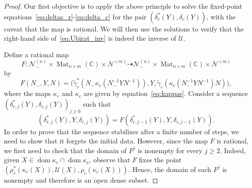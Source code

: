 \documentclass[11pt]{article}
\DeclareMathOperator{\Mat}{Mat}
\DeclareMathOperator{\dom}{dom}
\theoremstyle{definition}\newtheorem{definition}[theorem]{Definition}
\theoremstyle{definition}\newtheorem{remark}[theorem]{Remark}
\theoremstyle{remark}
\numberwithin{equation}{section}
\begin{document}
\begin{proof}
    Our first objective is to apply the above principle to solve the fixed-point equations~\eqref{eq:deltas_r}-\eqref{eq:delta_c} for the pair $(\delta_r^*(Y),\delta_c(Y))$, with the caveat that the map is rational. We will then use the solutions to verify that the right-hand side of~\eqref{eq:Ubirat_inv} is indeed the inverse of $\mathcal{U}$.
    
    Define a rational map 
    \begin{equation*}
        F : \mathcal{N}_-^{(n)}\times \Mat_{n\times m}(\mathbb{C})\times  \mathcal{N}^{(m)} \dashrightarrow \mathcal{N}_-^{(n)}\times  \Mat_{n\times m}(\mathbb{C}) \times \mathcal{N}^{(m)} 
    \end{equation*}
    by
       \begin{equation*}
        F(N_-,Y,N) = \big(\tilde{\gamma}_r^*(N_-\kappa_r(N_-^{-1}YN^{-1})), Y,\tilde{\gamma}_c(\kappa_c(N_-^{-1}YN^{-1})N) \big),
    \end{equation*}
    where the maps $\kappa_r$ and $\kappa_c$ are given by equation~\eqref{eq:kappas}. Consider a sequence $(\delta_{r,j}^*(Y),\delta_{c,j}(Y))_{j \geq 0}$
    such that
    \begin{equation}\label{eq:delta_dynamics}
        (\delta_{r,j}^*(Y),Y,\delta_{c,j}(Y)) = F(\delta_{r,j-1}^*(Y),Y,\delta_{c,j-1}(Y)).
    \end{equation}
    In order to prove that the sequence stabilizes after a finite number of steps, we need to show that it forgets the initial data. However, since the map $F$ is rational, we first need to check that the domain of $F^j$ is nonempty for every $j \geq 2$. Indeed, given $X \in \dom \kappa_r \cap \dom \kappa_c$, observe that $F$ fixes the point $(\rho_r^*(\kappa_r(X)),\mathcal{U}(X),\rho_c(\kappa_c(X)))$. Hence, the domain of each $F^j$ is nonempty and therefore is an open dense subset. 
    

\end{proof}
\end{document}
